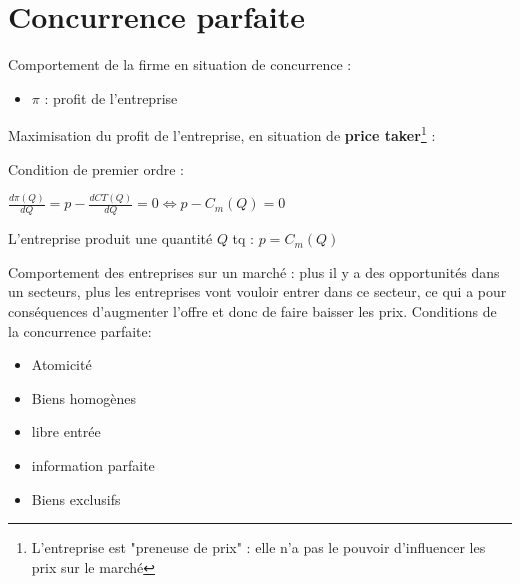 \section{Concurrence parfaite}
Comportement de la firme en situation de concurrence :
\begin{itemize}
    \item $\pi$ : profit de l'entreprise
\end{itemize}
Maximisation du profit de l'entreprise, en situation de \textbf{price taker}\footnote{L'entreprise est "preneuse de prix" : elle n'a pas le pouvoir d'influencer les prix sur le marché} : 
\begin{center}
    \Large{}
\end{center}
Condition de premier ordre :
\begin{center}
    \Large{}
\end{center}
\begin{center}
    \Large{$\frac{d\pi(Q)}{dQ} = p - \frac{dCT(Q)}{dQ} = 0 \Longleftrightarrow p - C_{m}(Q) = 0$}
\end{center}
L'entreprise produit une quantité $Q$ tq : \Large{$p=C_{m}(Q)$} \newline

Comportement des entreprises sur un marché : plus il y a des opportunités dans un secteurs, plus les entreprises vont vouloir entrer dans ce secteur, ce qui a pour conséquences d'augmenter l'offre et donc de faire baisser les prix. \newline
Conditions de la concurrence parfaite:
\begin{center}
    \begin{itemize}
    \item Atomicité
    \item Biens homogènes
    \item libre entrée
    \item information parfaite
    \item Biens exclusifs
\end{itemize}
\end{center}
\newpage
